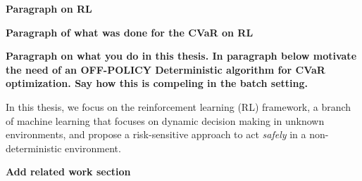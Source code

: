 

\textbf{Paragraph on RL}

\textbf{Paragraph of what was done for the CVaR on RL}

\textbf{Paragraph on what you do in this thesis. In paragraph below motivate the need of an OFF-POLICY Deterministic algorithm for CVaR optimization. Say how this is compeling in the batch setting.}

In this thesis, we focus on the reinforcement learning (RL) framework, a branch of machine learning
that focuses on dynamic decision making in unknown environments, and propose a risk-sensitive approach
to act \textit{safely} in a non-deterministic environment.





\textbf{Add related work section}